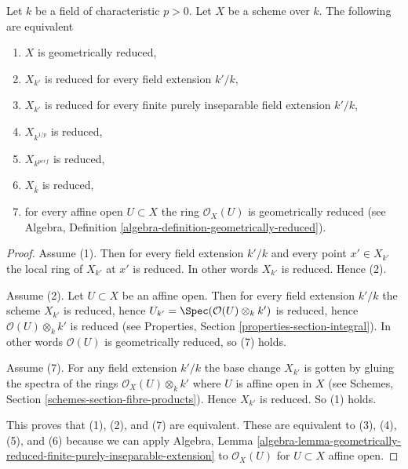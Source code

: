 \begin{lemma}
\label{lemma-geometrically-reduced}
Let $k$ be a field of characteristic $p > 0$. Let $X$ be a scheme over $k$.
The following are equivalent
\begin{enumerate}
\item $X$ is geometrically reduced,
\item $X_{k'}$ is reduced for every field extension $k'/k$,
\item $X_{k'}$ is reduced for every finite purely inseparable field extension
$k'/k$,
\item $X_{k^{1/p}}$ is reduced,
\item $X_{k^{perf}}$ is reduced,
\item $X_{\bar k}$ is reduced,
\item for every affine open $U \subset X$ the ring $\mathcal{O}_X(U)$
is geometrically reduced (see
Algebra, Definition \ref{algebra-definition-geometrically-reduced}).
\end{enumerate}
\end{lemma}

\begin{proof}
Assume (1). Then for every field extension $k'/k$ and
every point $x' \in X_{k'}$ the local ring of $X_{k'}$ at $x'$
is reduced. In other words $X_{k'}$ is reduced. Hence (2).

\medskip\noindent
Assume (2). Let $U \subset X$ be an affine open. Then for
every field extension $k'/k$ the scheme $X_{k'}$ is reduced, hence
$U_{k'} = \Spec(\mathcal{O}(U)\otimes_k k')$ is reduced,
hence $\mathcal{O}(U)\otimes_k k'$ is reduced (see Properties,
Section \ref{properties-section-integral}). In other words
$\mathcal{O}(U)$ is geometrically reduced, so (7) holds.

\medskip\noindent
Assume (7). For any field extension $k'/k$ the base
change $X_{k'}$ is gotten by gluing the spectra of the
rings $\mathcal{O}_X(U) \otimes_k k'$ where $U$ is affine open
in $X$ (see Schemes, Section \ref{schemes-section-fibre-products}).
Hence $X_{k'}$ is reduced. So (1) holds.

\medskip\noindent
This proves that (1), (2), and (7) are equivalent. These are equivalent
to (3), (4), (5), and (6) because we can apply Algebra, Lemma
\ref{algebra-lemma-geometrically-reduced-finite-purely-inseparable-extension}
to $\mathcal{O}_X(U)$ for $U \subset X$ affine open.
\end{proof}

